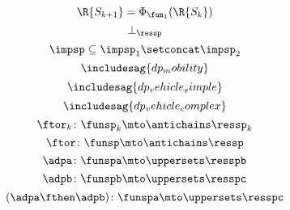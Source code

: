 {\begin{forslides}
\begin{equation*}
    \label{eq:genfun_13}
    \R{S_{k+1}}=\Phi_{\fun_1}(\R{S_k})
\end{equation*}
  \begin{equation*}
    \label{eq:genfun_14}
    \bot_{\ressp}
\end{equation*}
\begin{equation*}
  \label{eq:imp_comp}
  \impsp \subseteq \impsp_{1} \setconcat \impsp_{2}
\end{equation*}
    \begin{equation*}
        \label{eq:dp_mob_1}
        \includesag{dp_mobility}
    \end{equation*}
        \begin{equation*}
        \label{eq:dp_mob_2}
        \includesag{dp_vehicle_simple}
    \end{equation*}
        \begin{equation*}
        \label{eq:dp_mob_3}
        \includesag{dp_vehicle_complex}
    \end{equation*}
            \begin{equation*}
        \label{eq:dp_mob_4}
        \ftor_k\colon \funsp_k \mto \antichains \ressp_k
    \end{equation*}
                \begin{equation*}
        \label{eq:dp_mob_5}
        \ftor\colon \funsp \mto \antichains \ressp
    \end{equation*}
                    \begin{equation*}
        \label{eq:dp_mob_6}
        \adpa\colon \funspa \mto \uppersets \resspb
    \end{equation*}
    \begin{equation*}
        \label{eq:dp_mob_7}
        \adpb\colon \funspb \mto \uppersets \resspc
    \end{equation*}
    \begin{equation*}
        \label{eq:dp_mob_8}
        (\adpa \fthen \adpb) \colon \funspa \mto \uppersets \resspc
    \end{equation*}
\end{forslides}
}


